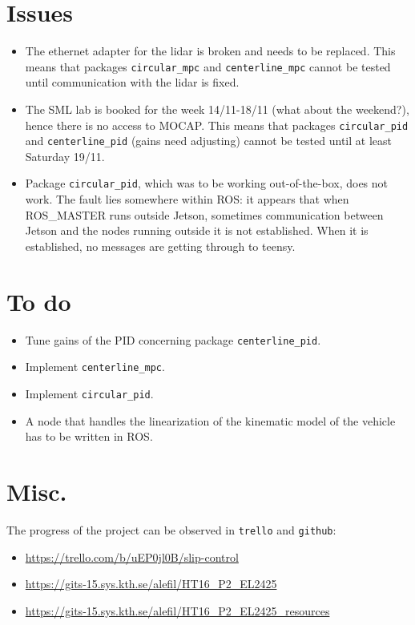 \documentclass[oneside,12pt]{article}
\begin{document}
\section{Issues}

\begin{itemize}
  \item The ethernet adapter for the lidar is broken and needs to be replaced.
    This means that packages \texttt{circular\_mpc} and \texttt{centerline\_mpc}
    cannot be tested until communication with the lidar is fixed.
  \item The SML lab is booked for the week 14/11-18/11 (what about the weekend?),
    hence there is no access to MOCAP. This means that packages
    \texttt{circular\_pid} and \texttt{centerline\_pid} (gains need adjusting)
    cannot be tested until at least Saturday 19/11.
  \item Package \texttt{circular\_pid}, which was to be working out-of-the-box,
    does not work. The fault lies somewhere within ROS: it appears that when
    ROS\_MASTER runs outside Jetson, sometimes communication between Jetson and the
    nodes running outside it is not established. When it is established, no
    messages are getting through to teensy.
\end{itemize}


\section{To do}

\begin{itemize}
  \item Tune gains of the PID concerning package \texttt{centerline\_pid}.
  \item Implement \texttt{centerline\_mpc}.
  \item Implement \texttt{circular\_pid}.
  \item A node that handles the linearization of the kinematic model of the
    vehicle has to be written in ROS.
\end{itemize}

\section{Misc.}

The progress of the project can be observed in \texttt{trello} and \texttt{github}:

\begin{itemize}
  \item \url{https://trello.com/b/uEP0jl0B/slip-control}
  \item \url{https://gits-15.sys.kth.se/alefil/HT16_P2_EL2425}
  \item \url{https://gits-15.sys.kth.se/alefil/HT16_P2_EL2425_resources}
\end{itemize}
\end{document}
